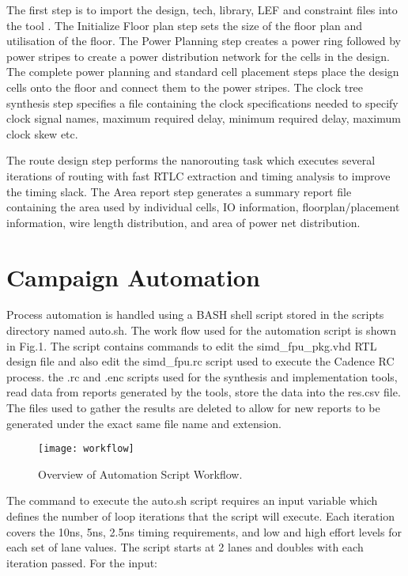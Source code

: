 \documentclass[conference]{IEEEtran}
\begin{document}
The first step is to import the design, tech, library, LEF and constraint files into the tool \cite{encounter}.
The Initialize Floor plan step sets the size of the floor plan and utilisation of the floor.
The Power Planning step creates a power ring followed by power stripes to create a power distribution network for the cells in the design. The complete power planning and standard cell placement steps place the design cells onto the floor and connect them to the power stripes. The clock tree synthesis step specifies a file containing the clock specifications needed to specify  clock signal names, maximum required delay, minimum required delay, maximum clock skew etc.
\newline

The route design step performs the nanorouting task which executes several iterations of routing with fast RTLC extraction and timing analysis to improve the timing slack. The Area report step generates a summary report file containing the area used by individual cells, IO information, floorplan/placement information, wire length distribution, and area of power net distribution.

\section{Campaign Automation}

Process automation is handled using a BASH shell script stored in the scripts directory named auto.sh. The work flow used for the automation script is shown in Fig.1. The script contains commands to edit the simd\_fpu\_pkg.vhd RTL design file and also edit the simd\_fpu.rc script used to execute the Cadence RC process. the .rc and .enc scripts used for the synthesis and implementation tools, read data from reports generated by the tools, store the data into the res.csv file.  The files used to gather the results are deleted to allow for new reports to be generated under the exact same file name and extension.
\newline

\begin{figure}[!t]
\centering
\texttt{[image: workflow]}
\caption{Overview of Automation Script Workflow.}
\label{fig_sim}
\end{figure}

The command to execute the auto.sh script requires an input variable which defines the number of loop iterations that the script will execute. Each iteration covers the 10ns,  5ns, 2.5ns timing requirements, and low and high effort levels for each set of lane values. The script starts at 2 lanes and doubles with each iteration passed. For the input:
\end{document}
